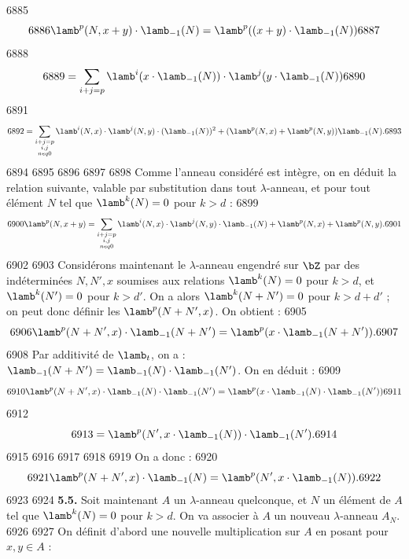   6885	\[
  6886	\lamb^p(N,x+y) \cdot \lamb_{-1}(N) = \lamb^p((x+y) \cdot \lamb_{-1}(N))
  6887	\]
  6888	\[
  6889	= \sum_{i+j=p} \lamb^i(x \cdot \lamb_{-1}(N)) \cdot \lamb^j(y \cdot \lamb_{-1}(N))
  6890	\]
  6891	\[
  6892	= \sum_{\substack{i+j=p \\ i,j \\neq 0}} \lamb^i(N,x) \cdot \lamb^j(N,y) \cdot (\lamb_{-1}(N))^2 + (\lamb^p(N,x) + \lamb^p(N,y)) \lamb_{-1}(N).
  6893	\]
  6894	
  6895	%
  6896	%
  6897	%
  6898	Comme l'anneau consid\'er\'e est int\`egre, on en d\'eduit la relation suivante, valable par substitution dans tout $\lambda$-anneau, et pour tout \'el\'ement $N$ tel que $\lamb^k(N) = 0$ pour $k > d$ :
  6899	\begin{equation}
  6900	\lamb^p(N,x+y) = \sum_{\substack{i+j=p \\ i,j \\neq 0}} \lamb^i(N,x) \cdot \lamb^j(N,y) \cdot \lamb_{-1}(N) + \lamb^p(N,x) + \lamb^p(N,y).
  6901	\end{equation}
  6902	
  6903		Consid\'erons maintenant le $\lambda$-anneau engendr\'e sur $\bZ$ par des ind\'etermin\'ees $N, N', x$ soumises aux relations $\lamb^k(N) = 0$ pour $k > d$, et $\lamb^k(N') = 0$ pour $k > d'$. On a alors $\lamb^k(N+N') = 0$ pour $k > d+d'$ ; on peut donc d\'efinir les $\lamb^p(N+N',x)$. On obtient :
  6905	\[
  6906	\lamb^p(N+N',x) \cdot \lamb_{-1}(N+N') = \lamb^p(x \cdot \lamb_{-1}(N+N')).
  6907	\]
  6908	Par additivit\'e de $\lamb_t$, on a : $\lamb_{-1}(N+N') = \lamb_{-1}(N) \cdot \lamb_{-1}(N')$. On en d\'eduit :
  6909	\[
  6910	\lamb^p(N+N',x) \cdot \lamb_{-1}(N) \cdot \lamb_{-1}(N') = \lamb^p(x \cdot \lamb_{-1}(N) \cdot \lamb_{-1}(N'))
  6911	\]
  6912	\[
  6913	= \lamb^p(N', x \cdot \lamb_{-1}(N)) \cdot \lamb_{-1}(N').
  6914	\]
  6915	
  6916	%
  6917	%
  6918	%
  6919	On a donc :
  6920	\begin{equation}
  6921	\lamb^p(N+N',x) \cdot \lamb_{-1}(N) = \lamb^p(N', x \cdot \lamb_{-1}(N)).
  6922	\end{equation}
  6923	
  6924		\noindent\textbf{5.5.} Soit maintenant $A$ un $\lambda$-anneau quelconque, et $N$ un \'el\'ement de $A$ tel que $\lamb^k(N) = 0$ pour $k > d$. On va associer \`a $A$ un nouveau $\lambda$-anneau $A_N$.
  6926	
  6927		On d\'efinit d'abord une nouvelle multiplication sur $A$ en posant pour $x, y \in A$ :
